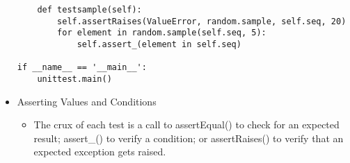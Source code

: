 \begin{itemize}
\begin{verbatim}
    def testsample(self):
        self.assertRaises(ValueError, random.sample, self.seq, 20)
        for element in random.sample(self.seq, 5):
            self.assert_(element in self.seq)

if __name__ == '__main__':
    unittest.main()\end{verbatim}

  \item
    Asserting Values and Conditions
    \begin{itemize}
      \item[]
	The crux of each test is a call to assertEqual() to check for
	an expected result; assert\_() to verify a condition; or
	assertRaises() to verify that an expected exception gets
	raised.  
    \end{itemize}

\end{itemize}
